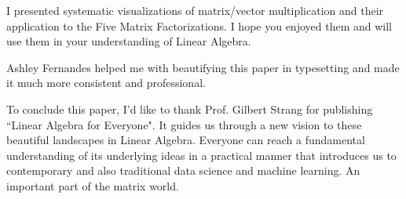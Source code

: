 \documentclass[letterpaper]{article}
\begin{document}
I presented systematic visualizations of matrix/vector multiplication and
their application to the Five Matrix Factorizations. I hope you
enjoyed them and will use them
in your understanding of Linear Algebra.

Ashley Fernandes helped me with beautifying this paper in typesetting
and made it much more consistent and professional.

To conclude this paper, I'd like to thank Prof. Gilbert Strang for
publishing ``Linear Algebra for Everyone". It guides us
through a new vision to these beautiful landscapes in Linear Algebra.
Everyone can reach a fundamental understanding of its underlying ideas
in a practical manner that introduces us to contemporary and also
traditional data science and machine learning. An important part of the matrix world.
\end{document}
